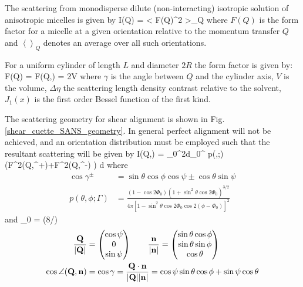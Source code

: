 The scattering from monodisperse dilute (non-interacting)
isotropic solution of anisotropic micelles is given by \BE I(Q) =
\left< \vert F(Q)\vert^2 \right>_Q \label{IQ_av} \EE where $F(Q)$
is the form factor for a micelle at a given orientation relative
to the momentum transfer $Q$ and $\left<\right>_Q$ denotes an
average over all such orientations.

For a uniform cylinder of length $L$ and diameter $2R$ the form
factor is given by:
\BE F(Q) = F(Q,\gamma) = 2\Delta\eta V
\EE
where $\gamma$ is the
angle between $Q$ and the cylinder axis, $V$ is the volume,
$\Delta\eta$ the scattering length density contrast relative to
the solvent, $J_1(x)$ is the first order Bessel function of the
first kind.

The scattering geometry for shear alignment is shown in Fig.
\ref{shear_cuette_SANS_geometry}. In general perfect alignment
will not be achieved, and an orientation distribution must be
employed such that the resultant scattering will be given by
\BE
I(Q,\psi) = \int_0^{2\pi}d\varPhi \int_0^\pi
p(\theta,\varPhi;\Gamma)\, \left(F^2(Q,\gamma^+)+F^2(Q,\gamma^-)
\right) \sin\theta d\theta
\EE
where
\begin{align}
\cos\gamma^\pm & = \sin\theta\cos\phi\cos\psi\pm\cos\theta\sin\psi \\[3mm]
p(\theta,\phi;\Gamma) & = \frac{(1-\cos
2\varPhi_0)(1+\sin^2\theta\cos 2\varPhi_0)^{3/2}}{4\pi\left[
1-\sin^2\theta\cos 2\varPhi_0\cos 2(\phi-\varPhi_0)\right]^2}
\end{align}
and
\varPhi_0 = \arctan(8/\Gamma)
\EE
\begin{align}
\frac{\mathbf{Q}}{\abs{\mathbf{Q}}} &=
\begin{pmatrix}
\cos \psi \\
0  \\
\sin \psi
\end{pmatrix} \qquad
\frac{\mathbf{n}}{\abs{\mathbf{n}}} =
\begin{pmatrix}
\sin \theta \cos \phi \\
\sin \theta \sin \phi  \\
\cos \theta
\end{pmatrix} \\
\cos \angle(\mathbf{Q,n}) &= \cos \gamma = \frac{\mathbf{Q\cdot n}}{\abs{\mathbf{Q}}\abs{\mathbf{n}}} =  \cos\psi \sin\theta \cos\phi + \sin\psi \cos\theta
\end{align}


